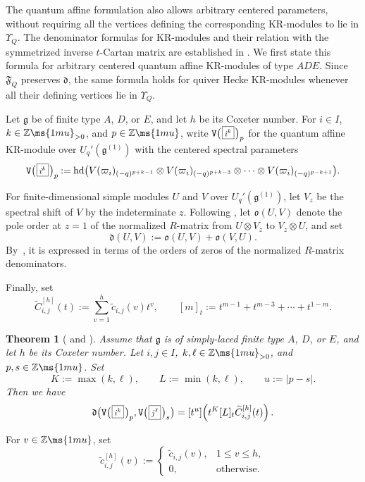 \documentclass[12pt, leqno]{amsart}
\numberwithin{equation}{section}
\theoremstyle{plain}
\newtheorem{theorem}[lemma]{Theorem}
\theoremstyle{definition}
\newcommand{\Vkm}[1]{%
  \ttV\bigl(\hspace{0.2ex}\scalebox{.8}{\(\boxed{#1}\)}\hspace{0.2ex}\bigr)%
}
\newcommand{\head}{{\operatorname{hd}}}
\newcommand{\seteq}{\mathbin{:=}}
\newcommand{\g}{\mathfrak{g}}
\newcommand{\Z}{\mathbb{Z}\ms{1mu}}
\newcommand{\de}{\mathfrak{d}}
\newcommand{\tC}{\widetilde{C}}
\newcommand{\tc}{\widetilde{c}}
\newcommand{\frakF}{\mathfrak{F}}
\newcommand{\frako}{\mathfrak{o}}
\newcommand{\ttV}{\mathtt{V}}
\begin{document}
The quantum affine formulation also allows arbitrary centered
parameters, without requiring all the vertices defining the
corresponding KR-modules to lie in \(\Upsilon_Q\).
The denominator formulas for KR-modules and their relation with the
symmetrized inverse \(t\)-Cartan matrix are established in
\cite{FO21,OS25,CFM26}.  We first state this formula
for arbitrary centered quantum affine KR-modules of type \(ADE\).
Since \(\frakF_Q\) preserves \(\de\), the same formula holds
for quiver Hecke KR-modules whenever all their defining
vertices lie in \(\Upsilon_Q\).

Let \(\g\) be of finite type \(A\), \(D\), or \(E\), and let \(h\)
be its Coxeter number.   For \(i\in I\), \(k\in\Z_{>0}\), and \(p\in\Z\), write
$\Vkm{i^k}_p$ for the quantum affine KR-module over
$U_q'(\g^{(1)})$ with the centered spectral parameters
\[
\Vkm{i^k}_p
\seteq \head\bigl(
V(\varpi_i)_{(-q)^{p+k-1}}\otimes
V(\varpi_i)_{(-q)^{p+k-3}}\otimes\cdots\otimes
V(\varpi_i)_{(-q)^{p-k+1}}\bigr).
\] 
 
For finite-dimensional simple modules \(U\) and \(V\) over
$U_q'(\g^{(1)})$, let \(V_z\) be the spectral shift of \(V\) by
the indeterminate \(z\). Following \cite[(5.3)]{CFM26}, let
\(\frako(U,V)\) denote the pole order at \(z=1\) of the normalized
\(R\)-matrix from \(U\otimes V_z\) to \(V_z\otimes U\), and set 
\[
\de(U,V) \seteq \frako(U,V)+\frako(V,U).
\]
By~\cite[Proposition~3.16]{KKOP20}, it is expressed in terms of the
orders of zeros of the normalized \(R\)-matrix denominators.

Finally, set
\[
\tC_{i,j}^{[h]}(t)
\seteq
\sum_{v=1}^{h}\tc_{i,j}(v)t^v,
\qquad
[m]_t
\seteq
t^{m-1}+t^{m-3}+\cdots+t^{1-m}.
\]

\begin{theorem}[{\cite{OS25} and \cite[Theorem~6.27]{CFM26}}]
\label{thm: ADE quantum affine KR d-values}
Assume that \(\g\) is of simply-laced finite type \(A\), \(D\), or
\(E\), and let \(h\) be its Coxeter number.
Let \(i,j\in I\), \(k,\ell\in\Z_{>0}\), and \(p,s\in\Z\).  Set
\[
K\seteq\max(k,\ell), \qquad L\seteq\min(k,\ell), \qquad u\seteq|p-s|.
\]
Then we have
\begin{equation}\label{eq: ADE quantum affine KR d-value}
\de\bigl(\Vkm{i^k}_p, \Vkm{j^\ell}_s \bigr)  =[t^u]\! \left( t^K[L]_t\tC_{i,j}^{[h]}(t) \right). 
\end{equation}
\end{theorem}

For \(v\in\Z\), set 
\[
\tc_{i,j}^{[h]}(v) \seteq
\begin{cases}
\tc_{i,j}(v),&1\leq v\leq h,\\
0,&\text{otherwise}.
\end{cases}
\]
\end{document}
